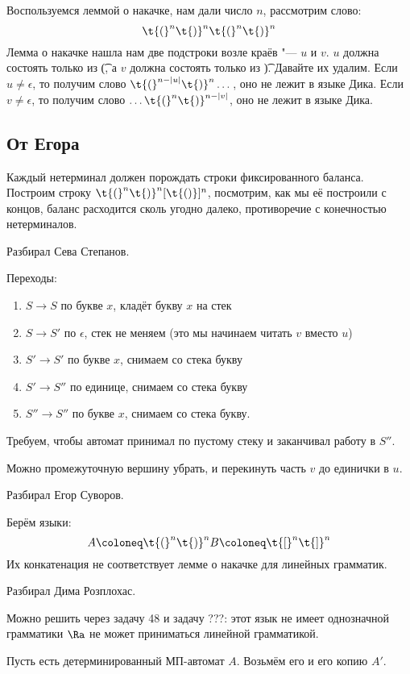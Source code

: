 	Воспользуемся леммой о накачке, нам дали число $n$, рассмотрим слово:
	\[
		\t{(}^n \t{)}^n \t{(}^n \t{)}^n
	\]
	Лемма о накачке нашла нам две подстроки возле краёв "--- $u$ и $v$.
	$u$ должна состоять только из \t{(}, а $v$ должна состоять только из \t{)}.
	Давайте их удалим.
	Если $u \ne \epsilon$, то получим слово $\t{(}^{n-|u|}\t{)}^n\dots$, оно не лежит в языке Дика.
	Если $v \ne \epsilon$, то получим слово $\dots\t{(}^n\t{)}^{n-|v|}$, оно не лежит в языке Дика.

	\subsection{От Егора}
		Каждый нетерминал должен порождать строки фиксированного баланса.
		Построим строку $\t{(}^n\t{)}^n[\t{()}]^{n}$, посмотрим, как мы её построили с концов, баланс расходится сколь угодно далеко,
		противоречие с конечностью нетерминалов.

	Разбирал Сева Степанов.

	Переходы:
	\begin{enumerate}
		\item
			$S\to S$ по букве $x$, кладёт букву $x$ на стек
		\item
			$S\to S'$ по $\epsilon$, стек не меняем (это мы начинаем читать $v$ вместо $u$)
		\item
			$S' \to S'$ по букве $x$, снимаем со стека букву
		\item
			$S' \to S''$ по единице, снимаем со стека букву
		\item
			$S'' \to S''$ по букве $x$, снимаем со стека букву.
	\end{enumerate}
	Требуем, чтобы автомат принимал по пустому стеку и заканчивал работу в $S''$.

	\begin{Rem}
		Можно промежуточную вершину убрать, и перекинуть часть $v$ до единички в $u$.
	\end{Rem}

	Разбирал Егор Суворов.

	Берём языки:
	\[
		A \coloneq \t{(}^n\t{)}^n \\
		B \coloneq \t{[}^n\t{]}^n
	\]
	Их конкатенация не соответствует лемме о накачке для линейных грамматик.

	Разбирал Дима Розплохас.

	\begin{Rem}
		Можно решить через задачу 48 и задачу ???: этот язык не имеет однозначной грамматики $\Ra$ не может приниматься линейной грамматикой.
	\end{Rem}
	Пусть есть детерминированный МП-автомат $A$.
	Возьмём его и его копию $A'$.

